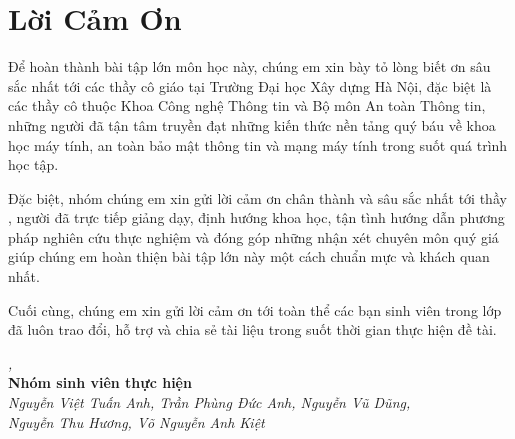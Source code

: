 
\chapter*{Lời Cảm Ơn}

Để hoàn thành bài tập lớn môn học này, chúng em xin bày tỏ lòng biết ơn sâu sắc nhất tới các thầy cô giáo tại Trường Đại học Xây dựng Hà Nội, đặc biệt là các thầy cô thuộc Khoa Công nghệ Thông tin và Bộ môn An toàn Thông tin, những người đã tận tâm truyền đạt những kiến thức nền tảng quý báu về khoa học máy tính, an toàn bảo mật thông tin và mạng máy tính trong suốt quá trình học tập.

Đặc biệt, nhóm chúng em xin gửi lời cảm ơn chân thành và sâu sắc nhất tới thầy \textbf{\ReportSupervisor}, người đã trực tiếp giảng dạy, định hướng khoa học, tận tình hướng dẫn phương pháp nghiên cứu thực nghiệm và đóng góp những nhận xét chuyên môn quý giá giúp chúng em hoàn thiện bài tập lớn này một cách chuẩn mực và khách quan nhất.

Cuối cùng, chúng em xin gửi lời cảm ơn tới toàn thể các bạn sinh viên trong lớp đã luôn trao đổi, hỗ trợ và chia sẻ tài liệu trong suốt thời gian thực hiện đề tài.

\vspace{1.5cm}

\begin{flushright}
    \textit{\ReportLocation, \ReportDate}\\[0.4cm]
    \textbf{Nhóm sinh viên thực hiện}\\[0.2cm]
    \textit{Nguyễn Việt Tuấn Anh, Trần Phùng Đức Anh, Nguyễn Vũ Dũng,}\\
    \textit{Nguyễn Thu Hương, Võ Nguyễn Anh Kiệt}
\end{flushright}
